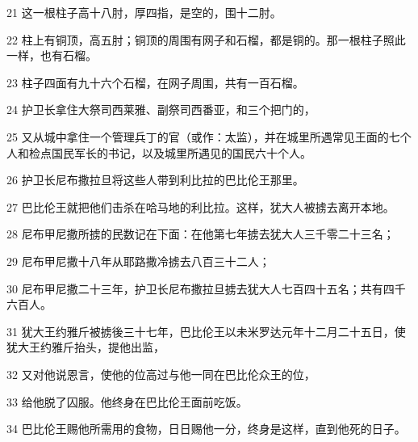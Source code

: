 \par 21 这一根柱子高十八肘，厚四指，是空的，围十二肘。
\par 22 柱上有铜顶，高五肘；铜顶的周围有网子和石榴，都是铜的。那一根柱子照此一样，也有石榴。
\par 23 柱子四面有九十六个石榴，在网子周围，共有一百石榴。
\par 24 护卫长拿住大祭司西莱雅、副祭司西番亚，和三个把门的，
\par 25 又从城中拿住一个管理兵丁的官（或作：太监），并在城里所遇常见王面的七个人和检点国民军长的书记，以及城里所遇见的国民六十个人。
\par 26 护卫长尼布撒拉旦将这些人带到利比拉的巴比伦王那里。
\par 27 巴比伦王就把他们击杀在哈马地的利比拉。这样，犹大人被掳去离开本地。
\par 28 尼布甲尼撒所掳的民数记在下面：在他第七年掳去犹大人三千零二十三名；
\par 29 尼布甲尼撒十八年从耶路撒冷掳去八百三十二人；
\par 30 尼布甲尼撒二十三年，护卫长尼布撒拉旦掳去犹大人七百四十五名；共有四千六百人。
\par 31 犹大王约雅斤被掳後三十七年，巴比伦王以未米罗达元年十二月二十五日，使犹大王约雅斤抬头，提他出监，
\par 32 又对他说恩言，使他的位高过与他一同在巴比伦众王的位，
\par 33 给他脱了囚服。他终身在巴比伦王面前吃饭。
\par 34 巴比伦王赐他所需用的食物，日日赐他一分，终身是这样，直到他死的日子。



